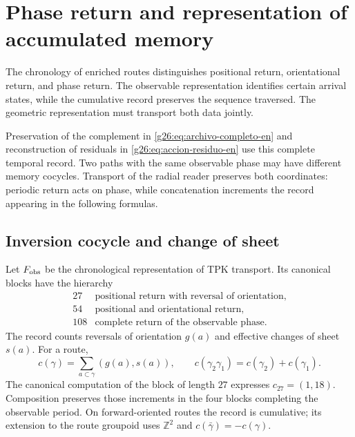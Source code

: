 
\section{Phase return and representation of accumulated memory}
\label{vii:sec:retorno-memoria-gravedad}

The chronology of enriched routes distinguishes positional return,
orientational return, and phase return. The observable representation
identifies certain arrival states, while the cumulative record
preserves the sequence traversed. The geometric representation must
transport both data jointly.

Preservation of the complement in
\eqref{g26:eq:archivo-completo-en} and reconstruction of residuals in
\eqref{g26:eq:accion-residuo-en} use this complete temporal record.
Two paths with the same observable phase may have different memory
cocycles. Transport of the radial reader preserves both coordinates:
periodic return acts on phase, while concatenation increments the record
appearing in the following formulas.

\subsection{Inversion cocycle and change of sheet}
\label{vii:subsec:cociclo-memoria}

Let \(F_{\rm obs}\) be the chronological representation of TPK transport.
Its canonical blocks have the hierarchy
\[
\begin{array}{c|l}
27&\text{positional return with reversal of orientation},\\
54&\text{positional and orientational return},\\
108&\text{complete return of the observable phase}.
\end{array}
\]
The record counts reversals of orientation \(g(a)\) and
effective changes of sheet \(s(a)\). For a route,
\begin{equation}
 c(\gamma)=\sum_{a\subset\gamma}(g(a),s(a)),\qquad
 c(\gamma_2\gamma_1)=c(\gamma_2)+c(\gamma_1).
 \label{vii:eq:cociclo-ruta}
\end{equation}
The canonical computation of the block of length \(27\) expresses
\(c_{27}=(1,18)\). Composition preserves those increments in
the four blocks completing the observable period.
On forward-oriented routes the record is cumulative;
its extension to the route groupoid uses \(\mathbb Z^2\) and
\(c(\bar\gamma)=-c(\gamma)\).

